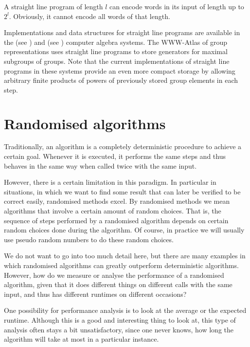 \begin{Rem}
A straight line program of length $l$ can encode words in its input
of length up to $2^l$. Obviously, it cannot encode all words of that
length.
\end{Rem}

Implementations and data structures for straight line programs are
available in the {\GAP} (see \cite{GAP4}) and {\MAGMA} (see
\cite{Magma})
computer algebra systems. The
WWW-Atlas of group representations uses straight line programs to
%
store generators for maximal subgroups of groups. Note that the
current implementations of straight line programs in these systems
provide an even more compact storage by allowing arbitrary finite
products of powers of previously stored group elements in each step.


\section{Randomised algorithms}
\label{montevegas}
%

Traditionally, an algorithm is a completely deterministic procedure to
achieve a certain goal. Whenever it is executed, it performs the same
steps and thus behaves in the same way when called twice with the same input.

However, there is a certain limitation in this paradigm. In particular
in situations, in which we want to find some result that can later
be verified to be correct easily, randomised methods excel. By
randomised
methods we mean algorithms that involve a certain amount of random
choices. That is, the sequence of steps performed by a randomised
algorithm depends on certain random choices done during the algorithm.
Of course, in practice we will usually use pseudo random numbers to
do these random choices.

We do not want to go into too much detail here, but there are many
examples in which randomised algorithms can greatly outperform
deterministic algorithms. However, how do we measure or analyse
the performance of a randomised algorithm, given that it does
different things on different calls with the same input, and thus
has different runtimes on different occasions?

One possibility for performance analysis is to look at the average
or the expected runtime. Although this is a good and
interesting thing to look at, this type of analysis often stays a
bit unsatisfactory, since one never knows, how long the algorithm will
take at most in a particular instance.

